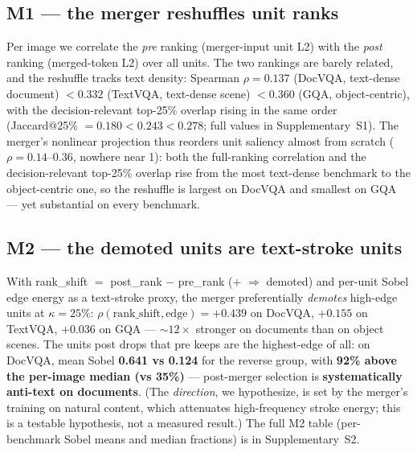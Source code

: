 \documentclass[sigconf,nonacm]{acmart}
\begin{document}
\subsection{M1 --- the merger reshuffles unit ranks}\label{sec:m1}

Per image we correlate the \emph{pre} ranking (merger-input unit L2) with the
\emph{post} ranking (merged-token L2) over all units. The two rankings are
barely related, and the reshuffle tracks text density: Spearman
$\rho = \mathbf{0.137}$ (DocVQA, text-dense document) $< 0.332$ (TextVQA,
text-dense scene) $< \mathbf{0.360}$ (GQA, object-centric), with the
decision-relevant top-25\% overlap rising in the same order (Jaccard@25\%
$= 0.180 < 0.243 < 0.278$; full values in Supplementary~S1). The merger's
nonlinear projection thus reorders unit saliency almost from scratch
($\rho = 0.14$--$0.36$, nowhere near 1): both the full-ranking correlation and
the decision-relevant top-25\% overlap rise from the most text-dense benchmark
to the object-centric one, so the reshuffle is largest on DocVQA and smallest on
GQA --- yet substantial on every benchmark.

\subsection{M2 --- the demoted units are text-stroke units}\label{sec:m2}

With rank\_shift $=$ post\_rank $-$ pre\_rank ($+$ $\Rightarrow$ demoted) and
per-unit Sobel edge energy as a text-stroke proxy, the merger preferentially
\emph{demotes} high-edge units at $\kappa = 25\%$: $\rho(\text{rank\_shift},
\text{edge}) = +0.439$ on DocVQA, $+0.155$ on TextVQA, $+0.036$ on GQA ---
${\sim}12\times$ stronger on documents than on object scenes. The units post
drops that pre keeps are the highest-edge of all: on DocVQA, mean Sobel
\textbf{0.641 vs 0.124} for the reverse group, with \textbf{92\% above the
per-image median (vs 35\%)} --- post-merger selection is \textbf{systematically
anti-text on documents}. (The \emph{direction}, we hypothesize, is set by the
merger's training on natural content, which attenuates high-frequency stroke
energy; this is a testable hypothesis, not a measured result.) The full M2 table
(per-benchmark Sobel means and median fractions) is in Supplementary~S2.
\end{document}
